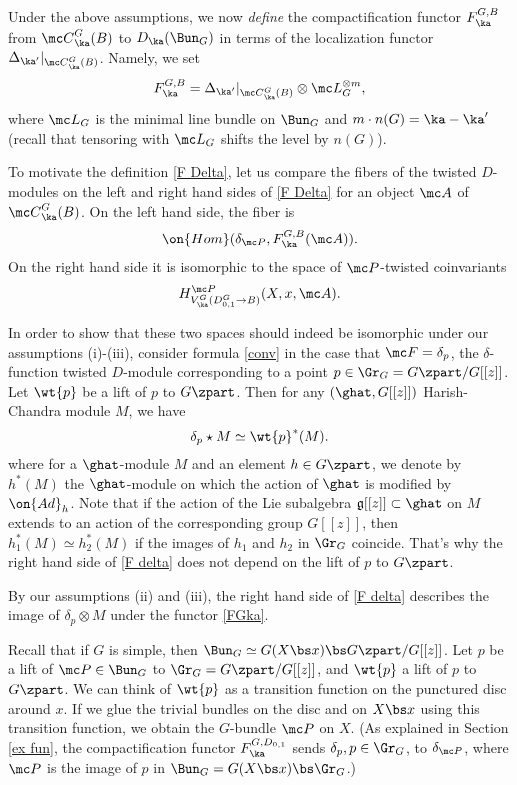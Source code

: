 \documentclass[11pt,reqno]{amsart}
\theoremstyle{plain}
\numberwithin{equation}{section}
\newcommand{\g}{\mathfrak{g}}
\theoremstyle{definition}
\begin{document}
Under the above assumptions, we now {\em define} the compactification
functor $F^{G,B}_\ka$ from ${\mc C}^G_\ka(B)$ to $D_\ka(\Bun_G)$ in
terms of the localization functor $\Delta_{\ka'}|_{{\mc
    C}^G_\ka(B)}$. Namely, we set
\begin{equation}    \label{F Delta}
F^{G,B}_\ka = \Delta_{\ka'}|_{{\mc C}^G_\ka(B)} \otimes {\mc
  L}_G^{\otimes m},
\end{equation}
where ${\mc L}_G$ is the minimal line bundle on $\Bun_G$ and $m \cdot
n(G) = \ka-\ka'$ (recall that tensoring with ${\mc L}_G$ shifts the
level by $n(G)$).

To motivate the definition \eqref{F Delta}, let us compare the fibers
of the twisted $D$-modules on the left and right hand sides of
\eqref{F Delta} for an object ${\mc A}$ of ${\mc C}^G_\ka(B)$. On the
left hand side, the fiber is
$$
\on{Hom}(\delta_{\mc P},F^{G,B}_\ka({\mc A})).
$$
On the right hand side it is isomorphic to the space of ${\mc
  P}$-twisted coinvariants
$$
H_{V^G_\ka(D^G_{0,1}\to B)}^{\mc P}(X,x,{\mc A}).
$$

In order to show that these two spaces should indeed be isomorphic
under our assumptions (i)-(iii), consider formula \eqref{conv} in the
case that ${\mc F} = \delta_p$, the $\delta$-function twisted
$D$-module corresponding to a point $p \in \Gr_G =
G\zpart/G[[z]]$. Let $\wt{p}$ be a lift of $p$ to $G\zpart$. Then for
any $(\ghat,G[[z]])$ Harish-Chandra module $M$, we have
\begin{equation}    \label{F delta}
\delta_p \star M \simeq \wt{p}^*(M).
\end{equation}
where for a $\ghat$-module $M$ and an element $h \in G\zpart$, we
denote by $h^*(M)$ the $\ghat$-module on which the action of $\ghat$
is modified by $\on{Ad}_h$. Note that if the action of the Lie
subalgebra $\g[[z]] \subset \ghat$ on $M$ extends to an action of the
corresponding group $G[[z]]$, then $h_1^*(M) \simeq h_2^*(M)$ if the
images of $h_1$ and $h_2$ in $\Gr_G$ coincide. That's why the
right hand side of \eqref{F delta} does not depend on the lift of $p$
to $G\zpart$.

By our assumptions (ii) and (iii), the right hand side of \eqref{F
  delta} describes the image of $\delta_p \otimes M$ under the
functor \eqref{FGka}.

Recall that if $G$ is simple, then $\Bun_G \simeq G(X\bs x) \bs
G\zpart/G[[z]]$. Let $p$ be a lift of ${\mc P} \in \Bun_G$ to $\Gr_G =
G\zpart/G[[z]]$, and $\wt{p}$ a lift of $p$ to $G\zpart$. We can think
of $\wt{p}$ as a transition function on the punctured disc around
$x$. If we glue the trivial bundles on the disc and on $X \bs x$ using
this transition function, we obtain the $G$-bundle ${\mc P}$ on $X$.
(As explained in Section \ref{ex fun}, the compactification functor
$F^{G,D_{0,1}}_\ka$ sends $\delta_p, p \in \Gr_G$, to $\delta_{\mc
  P}$, where ${\mc P}$ is the image of $p$ in $\Bun_G = G(X\bs x) \bs
\Gr_G$.)
\end{document}
